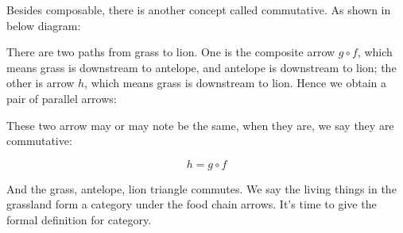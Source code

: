 \documentclass{article}
\begin{document}
Besides composable, there is another concept called commutative. As shown in below diagram:

\begin{center}
\end{center}

There are two paths from grass to lion. One is the composite arrow $g \circ f$, which means grass is downstream to antelope, and antelope is downstream to lion; the other is arrow $h$, which means grass is downstream to lion. Hence we obtain a pair of parallel arrows:

\begin{center}
\end{center}

These two arrow may or may note be the same, when they are, we say they are commutative:

\[
h = g \circ f
\]

And the grass, antelope, lion triangle commutes. We say the living things in the grassland form a category under the food chain arrows. It's time to give the formal definition for category.
\end{document}
